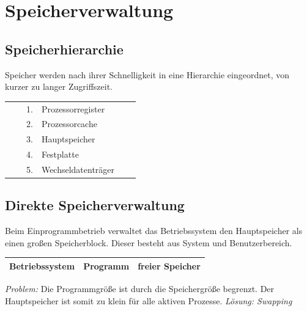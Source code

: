 \documentclass[12pt,a4paper]{article}
\begin{document}
\section{Speicherverwaltung}
\subsection{Speicherhierarchie}
    Speicher werden nach ihrer Schnelligkeit in eine Hierarchie eingeordnet, von kurzer zu langer Zugriffszeit.
	\begin{center}
		\begin{tabularx}{13cm}{XXXlXX}
			&&1.& Prozessorregister&&\\
			&&2.& Prozessorcache&&\\
			&&3.& Hauptspeicher&&\\
			&&4.& Festplatte&&\\
			&&5.& Wechseldatenträger&&\\
		\end{tabularx}
	\end{center}

\subsection{Direkte Speicherverwaltung}
    Beim Einprogrammbetrieb verwaltet das Betriebssystem den Hauptspeicher als einen großen Speicherblock. Dieser besteht aus System und Benutzerbereich.
    \begin{center}
        \begin{tabularx}{13cm}{|X|X|X|}
            \hline
            Betriebssystem&Programm&freier Speicher \\
            \hline
        \end{tabularx}
    \end{center}
    \textit{Problem:}\newline
    Die Programmgröße ist durch die Speichergröße begrenzt. Der Hauptspeicher ist somit zu klein für alle aktiven Prozesse.\newline
    \textit{Lösung: Swapping}
\end{document}
